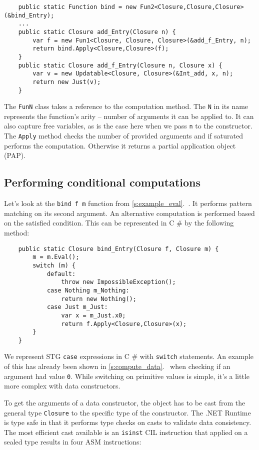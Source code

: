 \documentclass[en]{pracamgr}
\newcommand{\shrp}{%
  {\fontfamily{ppl}\selectfont\#%
  }}
\newcommand{\myref}[1]{\ref{#1}.~\textit{\nameref{#1}}}
\begin{document}
\begin{verbatim}
    public static Function bind = new Fun2<Closure,Closure,Closure>(&bind_Entry);
    ...
    public static Closure add_Entry(Closure n) {
        var f = new Fun1<Closure, Closure, Closure>(&add_f_Entry, n);
        return bind.Apply<Closure,Closure>(f);
    }
    public static Closure add_f_Entry(Closure n, Closure x) {
        var v = new Updatable<Closure, Closure>(&Int_add, x, n);
        return new Just(v);
    }
\end{verbatim}

The \texttt{FunN} class takes a reference to the computation method.
The \texttt{N} in its name represents the function's arity -- number of arguments it can be applied to.
It can also capture free variables,
as is the case here when we pass \texttt{n} to the constructor.
The \texttt{Apply} method checks the number of provided
arguments and if saturated performs the computation.
Otherwise it returns a partial application object (PAP).

\subsection{Performing conditional computations}\label{s:compute_cond}

Let's look at the \texttt{bind f m} function from \myref{s:example_eval}.
It performs pattern matching on its second argument.
An alternative computation is performed based on the satisfied condition.
This can be represented in C\shrp{} by the following method:

\begin{verbatim}
    public static Closure bind_Entry(Closure f, Closure m) {
        m = m.Eval();
        switch (m) {
            default: 
                throw new ImpossibleException();
            case Nothing m_Nothing:
                return new Nothing();
            case Just m_Just:
                var x = m_Just.x0;
                return f.Apply<Closure,Closure>(x);
        }
    }
\end{verbatim}

We represent STG \texttt{case} expressions in C\shrp{} with
\texttt{switch} statements. An example of this has already
been shown in \myref{s:compute_data} when checking if an
argument had value \texttt{0}. While switching on primitive
values is simple, it's a little more complex with data constructors.

To get the arguments of a data constructor, the object has
to be cast from the general type \texttt{Closure} to the
specific type of the constructor.
The .NET Runtime is type safe in that it performs type
checks on casts to validate data consistency.
The most efficient cast available is an \texttt{isinst} CIL
instruction that applied on a sealed type results in four ASM instructions:
\end{document}
